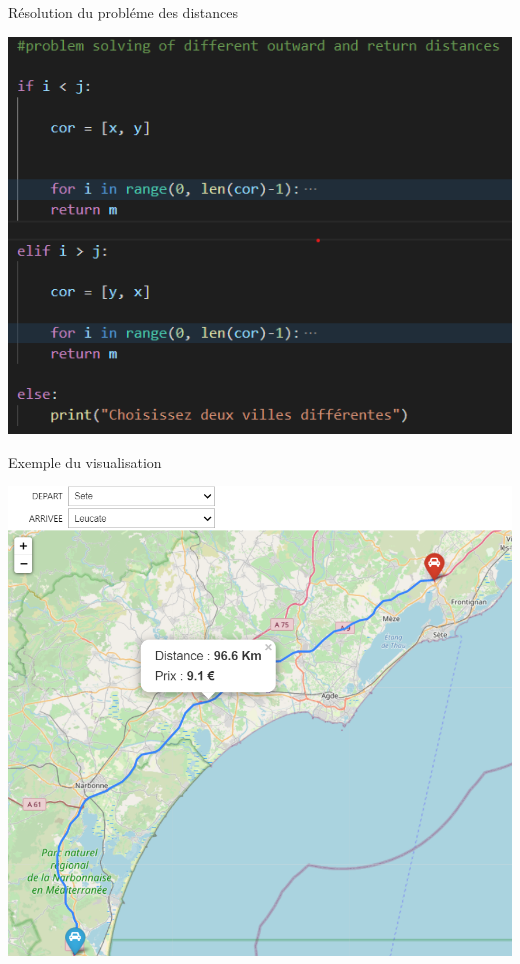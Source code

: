 \documentclass{beamer}
\begin{document}
\begin{frame}{Résolution du probléme des distances}

    \begin{center}
        \includegraphics[scale = 0.5]{map solve.png} 
    \end{center}
    
\end{frame}


\begin{frame}{Exemple du visualisation}

    \begin{center}
        \includegraphics[scale = 0.33]{map.png} 
    \end{center}
    
\end{frame}
\end{document}

